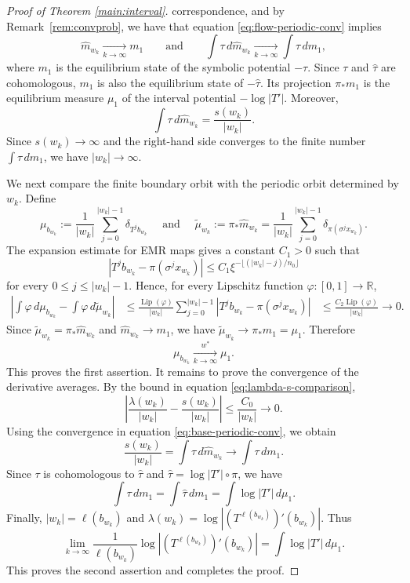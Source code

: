 \documentclass[letterpaper,11pt]{amsart}
\numberwithin{equation}{section}     %
\def\le{\leqslant}
\begin{document}
\begin{proof}[Proof of Theorem \ref{main:interval}]
correspondence, and by Remark~\ref{rem:convprob}, we have that  equation  \eqref{eq:flow-periodic-conv}
implies
\begin{equation}\label{eq:base-periodic-conv}
        \widehat m_{w_k}\xrightarrow[k\to\infty]{}m_1
        \qquad\text{and}\qquad
        \int \tau\,d\widehat m_{w_k}	\xrightarrow[k\to\infty]{} \int \tau\,dm_1,
\end{equation}
where $m_1$ is the equilibrium state of the symbolic potential $-\tau$. Since
$\tau$ and $\widehat\tau$ are cohomologous, $m_1$ is also the equilibrium state
of $-\widehat\tau$. Its projection $\pi_*m_1$ is the equilibrium measure
$\mu_1$ of the interval potential $-\log |T'|$. Moreover,
\[
        \int \tau\,d\widehat m_{w_k}=\frac{s(w_k)}{|w_k|}.
\]
Since $s(w_k)\to\infty$ and the right-hand side converges to the finite number
$\int\tau\,dm_1$, we have $|w_k|\to\infty$.

We next compare the finite boundary orbit with the periodic orbit determined
by $w_k$. Define
\[  \mu_{b_{w_k}}
        :=\frac1{|w_k|}\sum_{j=0}^{|w_k|-1}\delta_{T^j b_{w_k}}
\quad
\text{ and }
\quad
        \widetilde\mu_{w_k}:=\pi_*\widehat m_{w_k}
        =\frac1{|w_k|}\sum_{j=0}^{|w_k|-1}
          \delta_{\pi(\sigma^j x_{w_k})}.
\]
The expansion estimate for EMR maps gives a constant $C_1>0$ such that
\[
        |T^j b_{w_k}-\pi(\sigma^j x_{w_k})|
        \le C_1\xi^{-\lfloor(|w_k|-j)/n_0\rfloor}
\]
for every $0\le j\le |w_k|-1$. Hence, for every Lipschitz function
$\varphi:[0,1]\to\mathbb R$,
\[
\begin{aligned}
 \left|\int\varphi\,d\mu_{b_{w_k}}
       -\int\varphi\,d\widetilde\mu_{w_k}\right|
 &\le
 \frac{\operatorname{Lip}(\varphi)}{|w_k|}
 \sum_{j=0}^{|w_k|-1}
 |T^j b_{w_k}-\pi(\sigma^j x_{w_k})|  
 &\le
 \frac{C_2\operatorname{Lip}(\varphi)}{|w_k|}
 \longrightarrow 0 .
\end{aligned}
\]
Since $\widetilde\mu_{w_k}=\pi_*\widehat m_{w_k}$ and
$\widehat m_{w_k}\to m_1$, we have
$\widetilde\mu_{w_k}\to\pi_*m_1=\mu_1$. Therefore
\[
        \mu_{b_{w_k}}\xrightarrow[k\to\infty]{w^\ast}\mu_1.
\]
This proves the first assertion. It remains to prove the convergence of the derivative averages. By the bound in equation
\eqref{eq:lambda-s-comparison},
\[
        \left|
        \frac{\lambda(w_k)}{|w_k|}-\frac{s(w_k)}{|w_k|}
        \right|
        \le \frac{C_0}{|w_k|}\longrightarrow 0.
\]
Using the convergence in equation \eqref{eq:base-periodic-conv}, we obtain
\[
        \frac{s(w_k)}{|w_k|}
        =\int\tau\,d\widehat m_{w_k}
        \longrightarrow
        \int\tau\,dm_1.
\]
Since $\tau$ is cohomologous to $\widehat\tau$ and
$\widehat\tau=\log |T'|\circ\pi$, we have
\[
        \int\tau\,dm_1
        =\int\widehat\tau\,dm_1
        =\int\log |T'|\,d\mu_1.
\]
Finally, $|w_k|=\ell(b_{w_k})$ and  $\lambda(w_k)=\log |(T^{\ell(b_{w_k})})'(b_{w_k})|.$
Thus
\[
        \lim_{k\to\infty}
        \frac1{\ell(b_{w_k})}
        \log |(T^{\ell(b_{w_k})})'(b_{w_k})|
        =
        \int\log |T'|\,d\mu_1.
\]
This proves the second assertion and completes the proof.
\end{proof}
\end{document}
